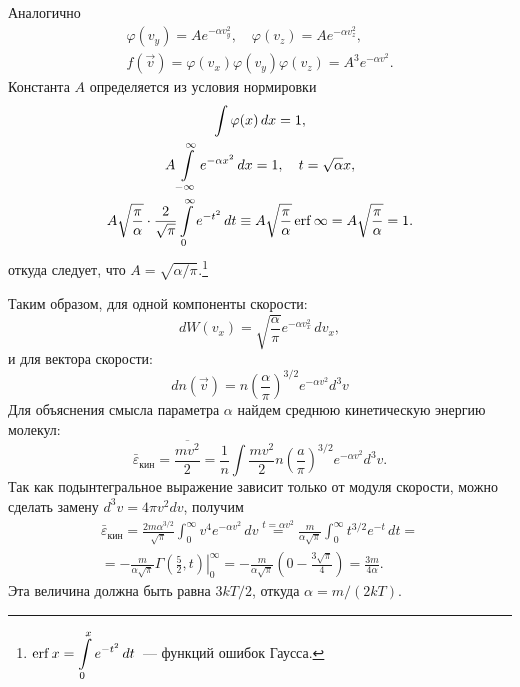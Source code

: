 Аналогично
\begin{gather*}
    \varphi(v_y) = A e^{-\alpha v_y^2}, \quad \varphi(v_z)=A e^{-\alpha v_z^2}, \\
    f(\vec{v}) = \varphi(v_x) \varphi(v_y) \varphi(v_z) = A^3 e^{-\alpha v^2}.
\end{gather*}
Константа $A$ определяется из условия нормировки 
\begin{gather*}
    \int \varphi(x) \, d x = 1,\\
    A \int\limits_{-\infty}^{\infty} e^{-\alpha x^2} \, dx = 1, \quad t = \sqrt{\alpha}{x},\\ 
    A \sqrt{\frac{\pi}{\alpha}} \cdot \frac{2}{\sqrt{\pi}} \int\limits_0^\infty e^{-t^2} \, dt \equiv  A \sqrt{\frac{\pi}{\alpha}} \operatorname{erf} \infty = A \sqrt{\frac{\pi}{\alpha}} = 1.
\end{gather*}
откуда следует, что $A = \sqrt{\alpha / \pi}$.\footnote{$\displaystyle \operatorname{erf} x =  \int\limits_{0}^x e^{-t^2} \, dt$~--- функций ошибок Гаусса.}

Таким образом, для одной компоненты скорости:
\begin{equation*}
    d W(v_x) = \sqrt{\frac{\alpha}{\pi}} e^{-\alpha v_x^2} \, d v_x,
\end{equation*}
и для вектора скорости:
\begin{equation*}
    d n(\vec{v}) = n \left(\frac{\alpha}{\pi}\right)^{3 / 2} e^{-\alpha v^2} d^3 v
\end{equation*}
Для объяснения смысла параметра $\alpha$ найдем среднюю кинетическую энергию молекул:
\begin{equation*}
    \bar{\varepsilon}_{\text{кин}} 
    = \frac{\overline{m v^2}}{2}
    = \frac{1}{n} \int \frac{m v^2}{2} n\left(\frac{a}{\pi}\right)^{3 / 2} e^{-\alpha v^2} d^3 v.
\end{equation*}
Так как подынтегральное выражение зависит только от модуля скорости, можно сделать замену  $d^3 v =  4 \pi v^2 d v$, получим
\begin{multline*}
    \bar{\varepsilon}_{\text{кин}}
        =  \frac{2m \alpha^{3 / 2}}{\sqrt{\pi}} \int_0^{\infty} v^4  e^{-\alpha v^2} \, d v 
        \overset{t = \alpha v^2}{=}  \frac{m}{\alpha \sqrt{\pi}} \int_0^{\infty} t^{3/2} e^{-t} \, dt = \\
        =  -\frac{m}{\alpha \sqrt{\pi}} \left.\Gamma \left(\frac{5}{2}, t\right) \right|_0^\infty 
        = -\frac{m}{\alpha \sqrt{\pi}} \left(0 - \frac{3 \sqrt{\pi}}{4} \right)
        = \frac{3 m}{4 \alpha}. 
\end{multline*}
Эта величина должна быть равна $3 k T / 2$, откуда $\alpha = m / (2 k T)$.

